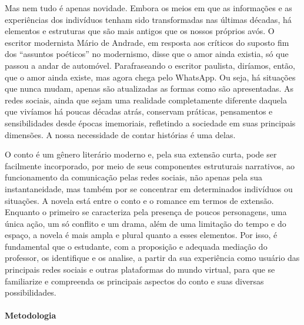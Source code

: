 \documentclass[12pt]{extarticle}
\begin{document}
Mas nem tudo é apenas novidade. Embora os meios em que as informações e
as experiências dos indivíduos tenham sido transformadas nas últimas
décadas, há elementos e estruturas que são mais antigos que os nossos
próprios avós. O escritor modernista Mário de Andrade, em resposta aos
críticos do suposto fim dos ``assuntos poéticos'' no modernismo, disse
que o amor ainda existia, só que passou a andar de automóvel.
Parafraseando o escritor paulista, diríamos, então, que o amor ainda
existe, mas agora chega pelo WhatsApp. Ou seja, há situações que nunca
mudam, apenas são atualizadas as formas como são apresentadas. As redes
sociais, ainda que sejam uma realidade completamente diferente daquela
que vivíamos há poucas décadas atrás, conservam práticas, pensamentos e
sensibilidades desde épocas imemoriais, refletindo a sociedade em suas
principais dimensões. A nossa necessidade de contar histórias é uma delas.

O conto é um gênero literário moderno e, pela sua extensão curta, pode
ser facilmente incorporado, por meio de seus componentes estruturais
narrativos, ao funcionamento da comunicação pelas redes sociais, não
apenas pela sua instantaneidade, mas também por se concentrar em
determinados indivíduos ou situações. A novela está entre o conto e o
romance em termos de extensão. Enquanto o primeiro se caracteriza pela
presença de poucos personagens, uma única ação, um só conflito e um
drama, além de uma limitação do tempo e do espaço, a novela é mais ampla
e plural quanto a esses elementos. Por isso, é fundamental que o
estudante, com a proposição e adequada mediação do professor, os
identifique e os analise, a partir da sua experiência como usuário das
principais redes sociais e outras plataformas do mundo virtual, para que
se familiarize e compreenda os principais aspectos do conto e suas
diversas possibilidades.

\paragraph{Metodologia} 
\end{document}
